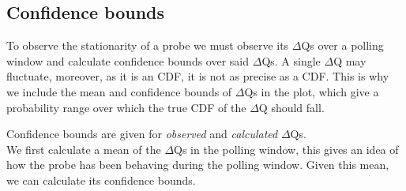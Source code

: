 \subsection{Confidence bounds}
    To observe the stationarity of a probe we must observe its $\Delta$Qs over a polling window and calculate confidence bounds over said $\Delta$Qs. A single $\Delta$Q may fluctuate, moreover, as it is an CDF, it is not as precise as a CDF. This is why we include the mean and confidence bounds of $\Delta$Qs in the plot, which give a probability range over which the true CDF of the $\Delta$Q should fall. \cite{conf-b}

    Confidence bounds are given for \textit{observed} and \textit{calculated} $\Delta$Qs. \\
    We first calculate a mean of the $\Delta$Qs in the polling window, this gives an idea of how the probe has been behaving during the polling window. Given this mean, we can calculate its confidence bounds.

